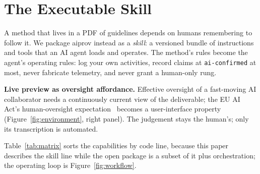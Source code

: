 \section{The Executable Skill}\label{sec:skill}

A method that lives in a PDF of guidelines depends on humans
remembering to follow it. We package aiprov instead as a
\emph{skill}: a versioned bundle of instructions and tools that an AI
agent loads and operates. The method's rules become the agent's
operating rules: log your own activities, record claims at
\texttt{ai-confirmed} at most, never fabricate telemetry, and never
grant a human-only rung.

\textbf{Live preview as oversight affordance.} Effective oversight of
a fast-moving AI collaborator needs a continuously current view of the
deliverable; the EU AI Act's human-oversight
expectation~\cite{eu-ai-act2024} becomes a user-interface property
(Figure~\ref{fig:environment}, right panel). The judgement stays the
human's; only its transcription is automated.

Table~\ref{tab:matrix} sorts the capabilities by code line, because
this paper describes the skill line while the open package is a subset
of it plus orchestration; the operating loop is
Figure~\ref{fig:workflow}.

